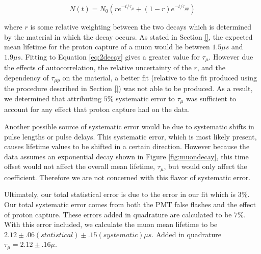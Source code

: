 \begin{center}
\begin{equation}
\label{eq:2decay}
N(t)=N_{0}(r e^{-t/\tau_{\mu}}+(1-r)e^{-t/\tau_{\mu p}})
\end{equation}
\end{center}

where $r$ is some relative weighting between the two decays which is determined by the material in which the decay occurs.  As stated in Section \ref{}, the expected mean lifetime for the proton capture of a muon would lie between $1.5 \mu s$ and $1.9 \mu s$.  Fitting to Equation \eqref{eq:2decay} gives a greater value for $\tau_{\mu}$.  However due the effects of autocorrelation, the relative uncertainty of the $r$, and the dependency of $\tau_{\mu p}$ on the material, a better fit (relative to the fit produced using the procedure described in Section \ref{}) was not able to be produced.  As a result, we determined that attributing $5\%$ systematic error to $\tau_{\mu}$ was sufficient to account for any effect that proton capture had on the data. 

Another possible source of systematic error would be due to systematic shifts in pulse lengths or pulse delays.  This systematic error, which is most likely present, causes lifetime values to be shifted in a certain direction.  However because the data assumes an exponential decay shown in Figure \ref{fig:muondecay}, this time offset would not affect the overall mean lifetime, $\tau_{\mu}$, but would only affect the coefficient.  Therefore we are not concerned with this flavor of systematic error.

Ultimately, our total statistical error is due to the error in our fit which is $3\%$.  Our total systematic error comes from both the PMT false flashes and the effect of proton capture.  These errors added in quadrature are calculated to be $7\%$.  With this error included, we calculate the muon mean lifetime to be $2.12\pm.06 (statistical)\pm.15 (systematic) \mu s$.  Added in quadrature $\tau_{\mu}=2.12\pm.16\mu$.
